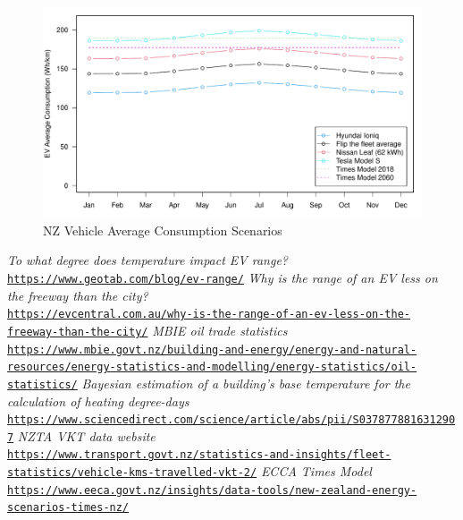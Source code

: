 \documentclass[
]{article}
\begin{document}
\begin{figure}
\centering
\includegraphics{final_report_files/figure-latex/vehicle_consum-1.pdf}
\caption{NZ Vehicle Average Consumption
Scenarios\label{fig:vehicle_consum}}
\end{figure}

\begin{thebibliography}{9}
\textit{To what degree does temperature impact EV range?}
\\\texttt{\url{https://www.geotab.com/blog/ev-range/}}
\textit{Why is the range of an EV less on the freeway than the city?}
\\\texttt{\url{https://evcentral.com.au/why-is-the-range-of-an-ev-less-on-the-freeway-than-the-city/}}
\textit{MBIE oil trade statistics}
\\\texttt{\url{https://www.mbie.govt.nz/building-and-energy/energy-and-natural-resources/energy-statistics-and-modelling/energy-statistics/oil-statistics/}}
\textit{Bayesian estimation of a building's base temperature for the calculation of heating degree-days}
\\\texttt{\url{https://www.sciencedirect.com/science/article/abs/pii/S0378778816312907}}
\textit{NZTA VKT data website}
\\\texttt{\url{https://www.transport.govt.nz/statistics-and-insights/fleet-statistics/vehicle-kms-travelled-vkt-2/}}
\textit{ECCA Times Model}
\\\texttt{\url{https://www.eeca.govt.nz/insights/data-tools/new-zealand-energy-scenarios-times-nz/}}
\end{thebibliography}
\end{document}
